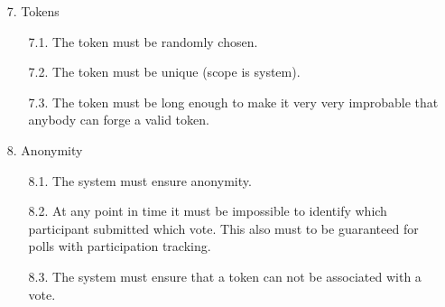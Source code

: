 \begin{enumerate}
%
%	
%	
%	
%	
%	
%	
%	
%	




\newpage
\item[7.] Tokens

	\begin{enumerate}
	\item[7.1.] The token must be randomly chosen. %
	
	
	\item[7.2.] The token must be unique (scope is system). %
	
	
	\item[7.3.] The token must be long enough to make it very very improbable that anybody can forge a
	valid token. %
	\end{enumerate}




\item[8.] Anonymity

	\begin{enumerate}
	\item[8.1.] The system must ensure anonymity. %
	
	
	\item[8.2.] At any point in time it must be impossible to identify which participant submitted which vote.
	This also must to be guaranteed for polls with participation tracking. %
	
	
	\item[8.3.] The system must ensure that a token can not be associated with a vote. %
	\end{enumerate}




\end{enumerate}
